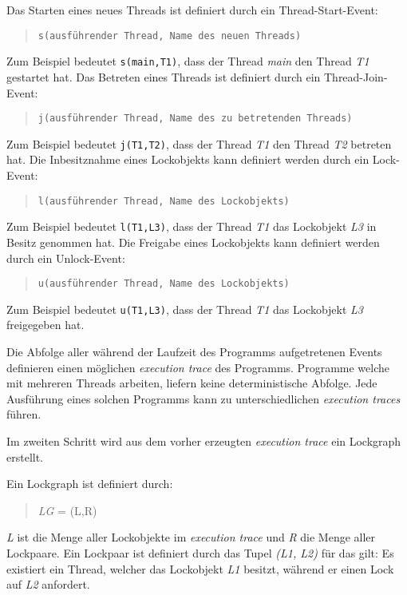 Das Starten eines neues Threads ist definiert durch ein Thread-Start-Event:
\begin{quote}
\texttt{s(ausführender Thread, Name des neuen Threads)}\autocite[vgl.][212]{bensalem2005dynamic}
\end{quote}
Zum Beispiel bedeutet \texttt{s(main,T1)}, dass der Thread \emph{main} den
Thread \emph{T1} gestartet hat. Das Betreten eines Threads ist definiert durch
ein Thread-Join-Event:
\begin{quote}
\texttt{j(ausführender Thread, Name des zu betretenden Threads)}\autocite[vgl.][212]{bensalem2005dynamic}
\end{quote}
Zum Beispiel bedeutet \texttt{j(T1,T2)}, dass der Thread \emph{T1} den Thread
\emph{T2} betreten hat. Die Inbesitznahme eines Lockobjekts kann definiert
werden durch ein Lock-Event:
\begin{quote}
\texttt{l(ausführender Thread, Name des Lockobjekts)}\autocite[vgl.][212]{bensalem2005dynamic}
\end{quote}
Zum Beispiel bedeutet \texttt{l(T1,L3)}, dass der Thread \emph{T1} das
Lockobjekt \emph{L3} in Besitz genommen hat. Die Freigabe eines Lockobjekts kann
definiert werden durch ein Unlock-Event:
\begin{quote}
\texttt{u(ausführender Thread, Name des Lockobjekts)}\autocite[vgl.][212]{bensalem2005dynamic}
\end{quote}
Zum Beispiel bedeutet \texttt{u(T1,L3)}, dass der Thread \emph{T1} das
Lockobjekt \emph{L3} freigegeben hat.

Die Abfolge aller während der Laufzeit des Programms aufgetretenen Events
definieren einen möglichen \emph{execution trace} des Programms. Programme
welche mit mehreren Threads arbeiten, liefern keine deterministische Abfolge.
Jede Ausführung eines solchen Programms kann zu unterschiedlichen
\emph{execution traces} führen. 

Im zweiten Schritt wird aus dem vorher erzeugten \emph{execution trace} ein
Lockgraph erstellt.

\begin{samepage}
  Ein Lockgraph ist definiert durch:
  \begin{quote}
  \emph{LG} = (L,R)
  \end{quote}
\end{samepage}
\emph{L} ist die Menge aller Lockobjekte im \emph{execution trace} und \emph{R}
die Menge aller Lockpaare. Ein Lockpaar ist definiert durch das Tupel \emph{(L1,
L2)} für das gilt: Es existiert ein Thread, welcher das Lockobjekt \emph{L1}
besitzt, während er einen Lock auf \emph{L2}
anfordert.\autocite[vgl.][72]{coffman1971system}\autocite[vgl.][213]{bensalem2005dynamic}


